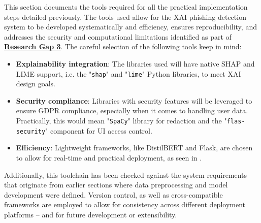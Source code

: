 
This section documents the tools required for all the practical implementation steps detailed previously. The tools used allow for the XAI phishing detection system to be developed systematically and efficiency, ensures reproducibility, and addresses the security and computational limitations identified as part of \hyperref[research-gap-3]{\uline{\textbf{Research Gap 3}}}. The careful selection of the following tools keep in mind:

\begin{itemize}
  \item \textbf{Explainability integration}: The libraries used will have native SHAP and LIME support, i.e. the "\texttt{shap}" and "\texttt{lime}" Python libraries, to meet XAI design goals.
  \item \textbf{Security compliance}: Libraries with security features will be leveraged to ensure GDPR compliance, especially when it comes to handling user data. Practically, this would mean "\texttt{SpaCy}" library for redaction and the "\texttt{flas-security}" component for UI access control.
  \item \textbf{Efficiency}: Lightweight frameworks, like DistilBERT and Flask, are chosen to allow for real-time and practical deployment, as seen in \cite{kapoor2024comparative}.
\end{itemize}

\noindent Additionally, this toolchain has been checked against the system requirements that originate from earlier sections where data preprocessing and model development were defined. Version control, as well as cross-compatible frameworks are employed to allow for consistency across different deployment platforms -- and for future development or extensibility.
